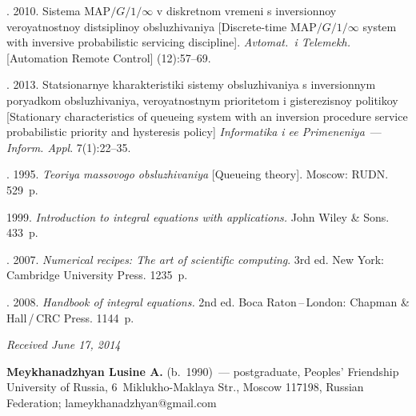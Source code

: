 \begin{multicols}{2}
{{\begin{thebibliography}{99}
. 2010.
Sistema MAP$/G/1/\infty$ v diskretnom vremeni s
inversionnoy veroyatnostnoy distsiplinoy
obsluzhivaniya
[Discrete-time MAP$/G/1/\infty$ system with inversive
probabilistic servicing discipline].
\textit{Avtomat.\ i Telemekh.}
[{Automation Remote Control}] (12):57--69.

. 2013.
Sta\-tsi\-o\-nar\-nye kharakteristiki sistemy obsluzhivaniya
s inversionnym poryadkom obsluzhivaniya,
veroyatnostnym prioritetom i gisterezisnoy politikoy
[Stationary characteristics of queueing system with
an inversion procedure service probabilistic priority
and hysteresis policy]
\textit{Informatika i ee Primeneniya}~---
\textit{Inform. Appl}. 7(1):22--35.

. 1995.
\textit{Teoriya massovogo obsluzhivaniya} [Queueing theory].
Moscow: RUDN. 529~p.


 1999.
\textit{Introduction to integral equations with applications.}
{John Wiley} \& {Sons}.
433~p.

. 2007.
\textit{Numerical recipes:
The art of scientific computing}.  3rd ed. New York: Cambridge University Press. 1235~p.

. 2008.
\textit{Handbook of integral equations.} 2nd ed.
Boca Raton\,--\,London: Chapman \& Hall\,/\,CRC Press. 1144~p.



\end{thebibliography}

 }
 }

\end{multicols}

\vspace*{-6pt}

\hfill{\small\textit{Received June 17, 2014}}

\vspace*{-18pt}

\Contr



\noindent
\textbf{Meykhanadzhyan Lusine A.} (b.\ 1990)~---
postgraduate, Peoples' Friendship University of Russia,
6~Miklukho-Maklaya Str., Moscow 117198, Russian Federation;
lameykhanadzhyan@gmail.com

